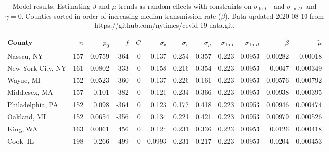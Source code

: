 \documentclass[12pt,letterpaper]{article}
\newcommand\slI{$\sigma_{\ln I}$\ }
\newcommand\slD{$\sigma_{\ln D}$}
\begin{document}
{\begin{appendices}
\begin{sidewaystable}
\caption{\label{tab:cons}
Model results. Estimating $\beta$ and $\mu$ trends as random effects with 
constraints on \slI\  and \slD\ and $\gamma = 0$.
Counties sorted in order of increasing median transmission rate ($\tilde\beta$).
Data updated 2020-08-10 from https://github.com/nytimes/covid-19-data.git.
}
\centering
{\scriptsize

\begin{tabular}{lrrrrrrrrrrr}
\hline
 County             &   $n$ &   $p_0$ &    $f$ &   $C$ &   $\sigma_\eta$ &   $\sigma_\beta$ &   $\sigma_\mu$ &   $\sigma_{\ln I}$ &   $\sigma_{\ln D}$ &   $\tilde{\beta}$ &   $\tilde{\mu}$ \\
\hline
 Nassau, NY         & 157   & 0.0759  & -364   &     0 &          0.137  &           0.254  &         0.357  &              0.223 &             0.0953 &           0.00282 &        0.00018  \\
 New York City, NY  & 161   & 0.0802  & -333   &     0 &          0.158  &           0.216  &         0.354  &              0.223 &             0.0953 &           0.0047  &        0.000349 \\
 Wayne, MI          & 152   & 0.0523  & -360   &     0 &          0.137  &           0.226  &         0.161  &              0.223 &             0.0953 &           0.00576 &        0.000792 \\
 Middlesex, MA      & 157   & 0.101   & -382   &     0 &          0.121  &           0.234  &         0.366  &              0.223 &             0.0953 &           0.00938 &        0.000395 \\
 Philadelphia, PA   & 152   & 0.098   & -364   &     0 &          0.123  &           0.173  &         0.418  &              0.223 &             0.0953 &           0.00946 &        0.000474 \\
 Oakland, MI        & 152   & 0.0654  & -356   &     0 &          0.134  &           0.221  &         0.421  &              0.223 &             0.0953 &           0.00979 &        0.000526 \\
 King, WA           & 163   & 0.0061  & -456   &     0 &          0.124  &           0.231  &         0.336  &              0.223 &             0.0953 &           0.0126  &        0.000418 \\
 Cook, IL           & 198   & 0.266   & -499   &     0 &          0.0993 &           0.231  &         0.217  &              0.223 &             0.0953 &           0.0204  &        0.000453 \\

\end{tabular}}
\end{sidewaystable}
\end{appendices}}
\end{document}
